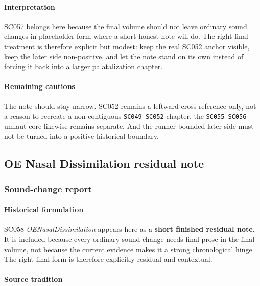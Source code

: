 \documentclass[
  british,
  a4paper,
]{article}
\begin{document}
\paragraph{Interpretation}\label{interpretation-35}

SC057 belongs here because the final volume should not leave ordinary
sound changes in placeholder form where a short honest note will do. The
right final treatment is therefore explicit but modest: keep the real
SC052 anchor visible, keep the later side non-positive, and let the note
stand on its own instead of forcing it back into a larger palatalization
chapter.

\paragraph{Remaining cautions}\label{remaining-cautions-35}

The note should stay narrow. SC052 remains a leftward cross-reference
only, not a reason to recreate a non-contiguous \texttt{SC049-SC052}
chapter. the \texttt{SC055-SC056} umlaut core likewise remains separate.
And the runner-bounded later side must not be turned into a positive
historical boundary.

\subsection{OE Nasal Dissimilation residual
note}\label{oe-nasal-dissimilation-residual-note}

\subsubsection{Sound-change report}\label{sound-change-report-36}

\paragraph{Historical formulation}\label{historical-formulation-36}

SC058 \emph{OENasalDissimilation} appears here as a \textbf{short
finished residual note}. It is included because every ordinary sound
change needs final prose in the final volume, not because the current
evidence makes it a strong chronological hinge. The right final form is
therefore explicitly residual and contextual.

\paragraph{Source tradition}\label{source-tradition-36}
\end{document}
